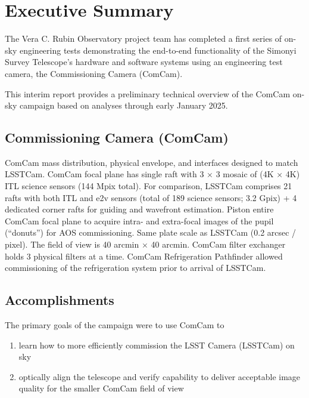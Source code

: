 \section{Executive Summary}
\label{sec:summary}

The Vera C. Rubin Observatory project team has completed a first series of on-sky engineering tests demonstrating the end-to-end functionality of the Simonyi Survey Telescope's hardware and software systems using an engineering test camera, the Commissioning Camera (ComCam).

\begin{note}
    This interim report provides a preliminary technical overview of the ComCam on-sky campaign based on analyses through early January 2025.
\end{note}

\emph{}

\subsection{Commissioning Camera (ComCam)}

ComCam mass distribution, physical envelope, and interfaces designed to match LSSTCam.
ComCam focal plane has single raft with 3 $\times$ 3 mosaic of (4K $\times$ 4K) ITL science sensors (144 Mpix total).
For comparison, LSSTCam comprises 21 rafts with both ITL and e2v sensors (total of 189 science sensors; 3.2 Gpix) + 4 dedicated corner rafts for guiding and wavefront estimation.
Piston entire ComCam focal plane to acquire intra- and extra-focal images of the pupil (``donuts'') for AOS commissioning.
Same plate scale as LSSTCam (0.2 arcsec / pixel).
The field of view is 40 arcmin $\times$ 40 arcmin.
ComCam filter exchanger holds 3 physical filters at a time.
ComCam Refrigeration Pathfinder allowed commissioning of the refrigeration system prior to arrival of LSSTCam.

\subsection{Accomplishments}

The primary goals of the campaign were to use ComCam to

\begin{enumerate}
    \item learn how to more efficiently commission the LSST Camera (LSSTCam) on sky
    \item optically align the telescope and verify capability to deliver acceptable image quality for the smaller ComCam field of view
\end{enumerate}

